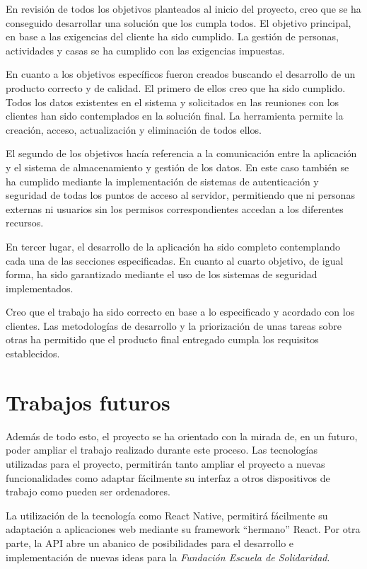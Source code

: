 En revisión de todos los objetivos planteados al inicio del proyecto, creo que se ha conseguido desarrollar una solución que los cumpla todos. El objetivo principal, en base a las exigencias del cliente ha sido cumplido. La gestión de personas, actividades y casas se ha cumplido con las exigencias impuestas.

En cuanto a los objetivos específicos fueron creados buscando el desarrollo de un producto correcto y de calidad. El primero de ellos creo que ha sido cumplido. Todos los datos existentes en el sistema y solicitados en las reuniones con los clientes han sido contemplados en la solución final. La herramienta permite la creación, acceso, actualización y eliminación de todos ellos.

El segundo de los objetivos hacía referencia a la comunicación entre la aplicación y el sistema de almacenamiento y gestión de los datos. En este caso también se ha cumplido mediante la implementación de sistemas de autenticación y seguridad de todas los puntos de acceso al servidor, permitiendo que ni personas externas ni usuarios sin los permisos correspondientes accedan a los diferentes recursos.

En tercer lugar, el desarrollo de la aplicación ha sido completo contemplando cada una de las secciones especificadas. En cuanto al cuarto objetivo, de igual forma, ha sido garantizado mediante el uso de los sistemas de seguridad implementados.

Creo que el trabajo ha sido correcto en base a lo especificado y acordado con los clientes. Las metodologías de desarrollo y la priorización de unas tareas sobre otras ha permitido que el producto final entregado cumpla los requisitos establecidos.

\section{Trabajos futuros}

Además de todo esto, el proyecto se ha orientado con la mirada de, en un futuro, poder ampliar el trabajo realizado durante este proceso. Las tecnologías utilizadas para el proyecto, permitirán tanto ampliar el proyecto a nuevas funcionalidades como adaptar fácilmente su interfaz a otros dispositivos de trabajo como pueden ser ordenadores.

La utilización de la tecnología como React Native, permitirá fácilmente su adaptación a aplicaciones web mediante su framework ``hermano'' React. Por otra parte, la API abre un abanico de posibilidades para el desarrollo e implementación de nuevas ideas para la \textit{Fundación Escuela de Solidaridad}.